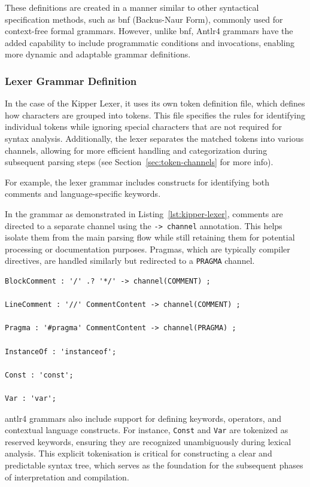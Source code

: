 These definitions are created in a manner similar to other syntactical specification methods, such as \acrshort{bnf} (Backus-Naur Form), commonly used for context-free formal grammars. However, unlike \acrshort{bnf}, Antlr4 grammars have the added capability to include programmatic conditions and invocations, enabling more dynamic and adaptable grammar definitions.

\subsubsection{Lexer Grammar Definition}
\label{sec:lexer-grammar-definition}

In the case of the Kipper Lexer, it uses its own token definition file, which defines how characters are grouped into tokens. This file specifies the rules for identifying individual tokens while ignoring special characters that are not required for syntax analysis. Additionally, the lexer separates the matched tokens into various channels, allowing for more efficient handling and categorization during subsequent parsing steps (see Section~\ref{sec:token-channels} for more info).

For example, the lexer grammar includes constructs for identifying both comments and language-specific keywords.

In the grammar as demonstrated in Listing~\ref{lst:kipper-lexer}, comments are directed to a separate channel using the \lstinline|-> channel| annotation. This helps isolate them from the main parsing flow while still retaining them for potential processing or documentation purposes. Pragmas, which are typically compiler directives, are handled similarly but redirected to a \lstinline|PRAGMA| channel.

\begin{lstlisting}[language=antlr4, caption={Sample snippet from the Kipper Lexer grammar}, label={lst:kipper-lexer}]
BlockComment : '/' .? '*/' -> channel(COMMENT) ;

LineComment : '//' CommentContent -> channel(COMMENT) ;

Pragma : '#pragma' CommentContent -> channel(PRAGMA) ;

InstanceOf : 'instanceof';

Const : 'const';

Var : 'var';
\end{lstlisting}

\Gls{antlr4} grammars also include support for defining keywords, operators, and contextual language constructs. For instance, \lstinline|Const| and \lstinline|Var| are tokenized as reserved keywords, ensuring they are recognized unambiguously during lexical analysis. This explicit tokenisation is critical for constructing a clear and predictable syntax tree, which serves as the foundation for the subsequent phases of interpretation and compilation.


